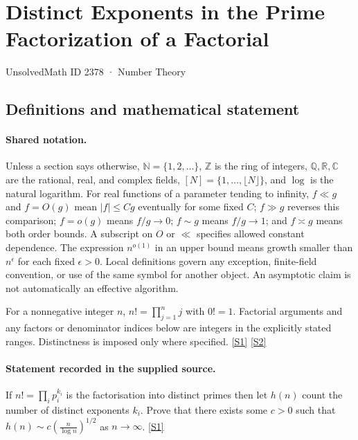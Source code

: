 \documentclass[11pt,a4paper]{article}
\newcommand{\N}{\mathbb{N}}
\newcommand{\Z}{\mathbb{Z}}
\newcommand{\Q}{\mathbb{Q}}
\newcommand{\R}{\mathbb{R}}
\newcommand{\C}{\mathbb{C}}
\newcommand{\sref}[2]{\hyperlink{source:#1:#2}{[S#2]}}
\begin{document}

\setcounter{section}{2377}

\section{Distinct Exponents in the Prime Factorization of a Factorial}\label{2378}

{\small\sffamily UnsolvedMath ID 2378 · Number Theory}

\subsection{Definitions and mathematical statement}

\paragraph{Shared notation.}Unless a section says otherwise, $\N=\{1,2,\ldots\}$,
$\Z$ is the ring of integers, $\Q,\R,\C$ are the rational, real, and complex
fields, $[N]=\{1,\ldots,\lfloor N\rfloor\}$, and $\log$ is the natural
logarithm. For real functions of a parameter tending to infinity,
$f\ll g$ and $f=O(g)$ mean $|f|\leq Cg$ eventually for some fixed $C$;
$f\gg g$ reverses this comparison; $f=o(g)$ means $f/g\to0$;
$f\sim g$ means $f/g\to1$; and $f\asymp g$ means both order bounds.
A subscript on $O$ or $\ll$ specifies allowed constant dependence.
The expression $n^{o(1)}$ in an upper bound means growth smaller than
$n^\epsilon$ for each fixed $\epsilon>0$. Local definitions govern any
exception, finite-field convention, or use of the same symbol for another
object. An asymptotic claim is not automatically an effective algorithm.



For a nonnegative integer $n$, $n!=\prod_{j=1}^n j$ with $0!=1$. Factorial arguments and any factors or denominator indices below are integers in the explicitly stated ranges. Distinctness is imposed only where specified. \sref{2378}{1} \sref{2378}{2}

\paragraph{Statement recorded in the supplied source.}
If $ n! = \prod_i p_i^{k_i} $ is the factorisation into distinct primes then let $h(n)$ count the number of distinct exponents $k_i$.
Prove that there exists some $c>0$ such that $ h(n) \sim c \left(\frac{n}{\log n}\right)^{1/2} $ as $n\to \infty$. \sref{2378}{1}
\end{document}

